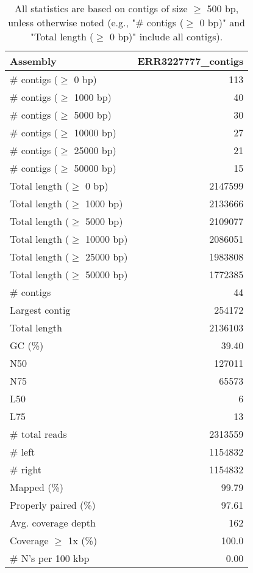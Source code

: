 \documentclass[12pt,a4paper]{article}
\begin{document}
\begin{table}[ht]
\begin{center}
\caption{All statistics are based on contigs of size $\geq$ 500 bp, unless otherwise noted (e.g., "\# contigs ($\geq$ 0 bp)" and "Total length ($\geq$ 0 bp)" include all contigs).}
\begin{tabular}{|l*{1}{|r}|}
\hline
Assembly & ERR3227777\_contigs \\ \hline
\# contigs ($\geq$ 0 bp) & 113 \\ \hline
\# contigs ($\geq$ 1000 bp) & 40 \\ \hline
\# contigs ($\geq$ 5000 bp) & 30 \\ \hline
\# contigs ($\geq$ 10000 bp) & 27 \\ \hline
\# contigs ($\geq$ 25000 bp) & 21 \\ \hline
\# contigs ($\geq$ 50000 bp) & 15 \\ \hline
Total length ($\geq$ 0 bp) & 2147599 \\ \hline
Total length ($\geq$ 1000 bp) & 2133666 \\ \hline
Total length ($\geq$ 5000 bp) & 2109077 \\ \hline
Total length ($\geq$ 10000 bp) & 2086051 \\ \hline
Total length ($\geq$ 25000 bp) & 1983808 \\ \hline
Total length ($\geq$ 50000 bp) & 1772385 \\ \hline
\# contigs & 44 \\ \hline
Largest contig & 254172 \\ \hline
Total length & 2136103 \\ \hline
GC (\%) & 39.40 \\ \hline
N50 & 127011 \\ \hline
N75 & 65573 \\ \hline
L50 & 6 \\ \hline
L75 & 13 \\ \hline
\# total reads & 2313559 \\ \hline
\# left & 1154832 \\ \hline
\# right & 1154832 \\ \hline
Mapped (\%) & 99.79 \\ \hline
Properly paired (\%) & 97.61 \\ \hline
Avg. coverage depth & 162 \\ \hline
Coverage $\geq$ 1x (\%) & 100.0 \\ \hline
\# N's per 100 kbp & 0.00 \\ \hline
\end{tabular}
\end{center}
\end{table}
\end{document}
